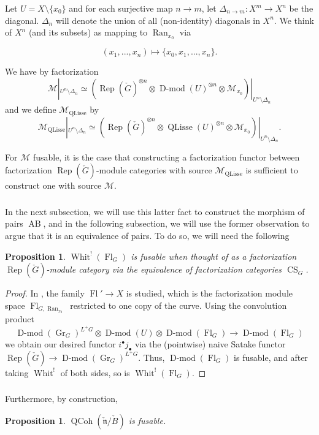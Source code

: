 \documentclass[10pt,a4paper]{amsart}
\newtheorem{prop}[subsubsection]{Proposition}
\newcommand{\on}[1]{\operatorname{#1}}
\newcommand{\Dmod}{\on{D-mod}}
\newcommand{\Gcheck}{\check{G}}
\newcommand{\ncheck}{\check{\mathfrak{n}}}
\newcommand{\Bcheck}{\check{B}}
\newcommand{\Ran}{\on{Ran}}
\newcommand{\sssec}[1]{\subsubsection{}}
\begin{document}
Let $U = X \setminus \{x_0\}$ and for each surjective map $n \to m$, let $\Delta_{n \to m} : X^m \longrightarrow X^n$ be the diagonal. $\Delta_n$ will denote the union of all (non-identity) diagonals in $X^n$. We think of $X^n$ (and its subsets) as mapping to $\Ran_{x_0}$ via

$$
(x_1, ..., x_n) \mapsto \{x_0, x_1, ..., x_n\}.
$$

We have by factorization
$$
\mathcal{M}|_{U^n \setminus \Delta_n} \simeq (\on{Rep}(\Gcheck)^{\otimes n} \otimes \Dmod(U)^{\otimes n} \otimes \mathcal{M}_{x_0})|_{U^n \setminus \Delta_n}
$$
and we define $\mathcal{M}_{\on{QLisse}}$ by
$$
\mathcal{M}_{\on{QLisse}}|_{U^n \setminus \Delta_n} \simeq (\on{Rep}(\Gcheck)^{\otimes n} \otimes \on{QLisse}(U)^{\otimes n} \otimes \mathcal{M}_{x_0})|_{U^n \setminus \Delta_n}.
$$

For $\mathcal{M}$ fusable, it is the case that constructing a factorization functor between factorization $\on{Rep}(\Gcheck)$-module categories with source $\mathcal{M}_{\on{QLisse}}$ is sufficient to construct one with source $\mathcal{M}$.

\sssec{}
In the next subsection, we will use this latter fact to construct the morphism of pairs $\on{AB}$, and in the following subsection, we will use the former observation to argue that it is an equivalence of pairs. To do so, we will need the following

\begin{prop}
    $\on{Whit}^!(\on{Fl}_G)$ is fusable when thought of as a factorization $\on{Rep}(\Gcheck)$-module category via the equivalence of factorization categories $\on{CS}_G$.
\end{prop}
\begin{proof}
    In \cite{Braiding}, the family $\on{Fl}' \to X$ is studied, which is the factorization module space $\on{Fl}_{G, \Ran_{x_0}}$ restricted to one copy of the curve. Using the convolution product
    $$
    \Dmod(\on{Gr}_G)^{L^+G} \otimes \Dmod(U) \otimes \Dmod(\on{Fl}_G) \longrightarrow \Dmod(\on{Fl}_G)
    $$
    we obtain our desired functor $i^{\bullet}j_{\bullet}$ via the (pointwise) naive Satake functor $\on{Rep}(\Gcheck) \to \Dmod(\on{Gr}_G)^{L^+G}$. Thus, $\Dmod(\on{Fl}_G)$ is fusable, and after taking $\on{Whit}^!$ of both sides, so is $\on{Whit}^!(\on{Fl}_G)$.
\end{proof}

\sssec{}
Furthermore, by construction,
\begin{prop}
    $\on{QCoh}(\ncheck/\Bcheck)$ is fusable.
\end{prop}
\end{document}

